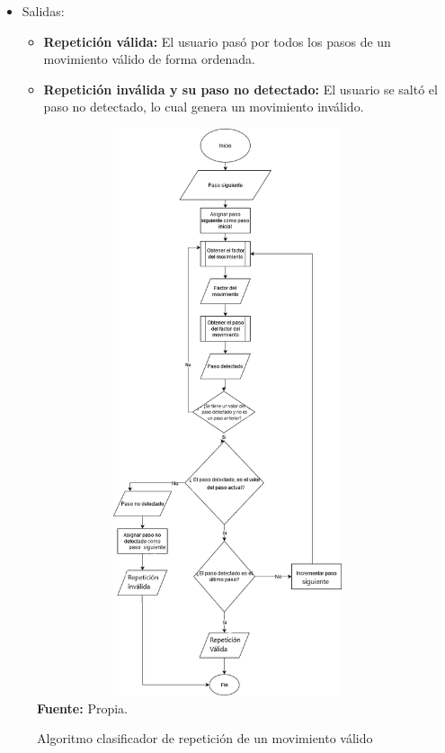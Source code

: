 \begin{itemize}
\begin{enumerate}[1.]
\item Incrementar el paso siguiente y volver a obtener un nuevo fotograma del Kinect (saltar al proceso No. 2). %
\item Asignar el paso no detectado como paso siguiente.
\item Finalizar el algoritmo con repetici\'on inv\'alida.
\end{enumerate}
\item Salidas:
\begin{itemize}
\item \textbf{Repetici\'on v\'alida:} El usuario pas\'o por todos los pasos de un movimiento v\'alido de forma ordenada.
\item \textbf{Repetici\'on inv\'alida y su paso no detectado:} El usuario se salt\'o el paso no detectado, lo cual genera un movimiento inv\'alido.
\end{itemize}
\end{itemize}
\begin{figure}[H]
	\caption{Algoritmo clasificador de repetici\'on de un movimiento v\'alido }
	\label{fig:capturaDatos}
	\centering
	\includegraphics[width=430px,height=630px]{graphics/flujoGramaRepiticion.png} \\
	\textbf{Fuente:} Propia.
\end{figure}
